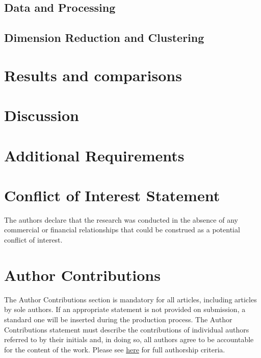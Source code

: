 \documentclass[utf8]{frontiersSCNS} %
\begin{document}
\subsection{Data and Processing}


\subsection{Dimension Reduction and Clustering}


\section{Results and comparisons}


\section{Discussion}


\section{Additional Requirements}

\section*{Conflict of Interest Statement}

The authors declare that the research was conducted in the absence of any commercial or financial relationships that could be construed as a potential conflict of interest.

\section*{Author Contributions}

The Author Contributions section is mandatory for all articles, including articles by sole authors. If an appropriate statement is not provided on submission, a standard one will be inserted during the production process. The Author Contributions statement must describe the contributions of individual authors referred to by their initials and, in doing so, all authors agree to be accountable for the content of the work. Please see  \href{http://home.frontiersin.org/about/author-guidelines#AuthorandContributors}{here} for full authorship criteria.
\end{document}
